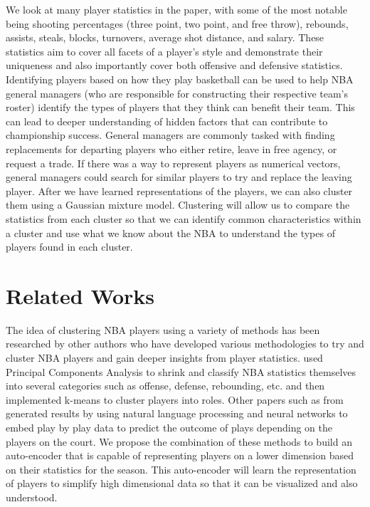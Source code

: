 \documentclass[12pt, letterpaper, titlepage]{article}
\begin{document}
We look at many player statistics in the paper, with some of the most notable being shooting percentages (three point, two point, and free throw), rebounds, assists, steals, blocks, turnovers, average shot distance, and salary. These statistics aim to cover all facets of a player’s style and demonstrate their uniqueness and also importantly cover both offensive and defensive statistics.  Identifying players based on how they play basketball can be used to help NBA general managers (who are responsible for constructing their respective team’s roster) identify the types of players that they think can benefit their team.  This can lead to deeper understanding of hidden factors that can contribute to championship success.  General managers are commonly tasked with finding replacements for departing players who either retire, leave in free agency, or request a trade.  If there was a way to represent players as numerical vectors, general managers could search for similar players to try and replace the leaving player. After we have learned representations of the players, we can also cluster them using a Gaussian mixture model.  Clustering will allow us to compare the statistics from each cluster so that we can identify common characteristics within a cluster and use what we know about the NBA to understand the types of players found in each cluster. 

\section{Related Works}
The idea of clustering NBA players using a variety of methods has been researched by other authors who have developed various methodologies to try and cluster NBA players and gain deeper insights from player statistics. \citet{muniz2022weighted} used Principal Components Analysis to shrink and classify NBA statistics themselves into several categories such as offense, defense, rebounding, etc. and then implemented k-means to cluster players into roles. Other papers such as from \citet{guan2023nba2vec} generated results by using natural language processing and neural networks to embed play by play data to predict the outcome of plays depending on the players on the court.  We propose the combination of these methods to build an auto-encoder that is capable of representing players on a lower dimension based on their statistics for the season.  This auto-encoder will learn the representation of players to simplify high dimensional data so that it can be visualized and also understood.
\end{document}
